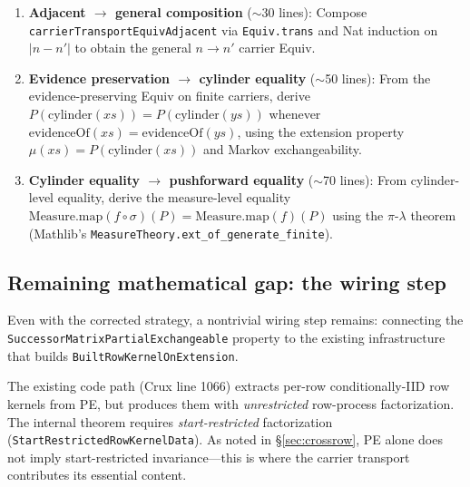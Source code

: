 \documentclass[11pt]{article}
\theoremstyle{definition}
\newcommand{\lean}[1]{\texttt{#1}}
\begin{document}
\begin{enumerate}[leftmargin=2em]
\item \textbf{Adjacent $\to$ general composition} ($\sim$30 lines):
  Compose \lean{carrierTransportEquivAdjacent} via \lean{Equiv.trans}
  and Nat induction on $|n - n'|$ to obtain the general $n \to n'$
  carrier Equiv.

\item \textbf{Evidence preservation $\to$ cylinder equality} ($\sim$50 lines):
  From the evidence-preserving Equiv on finite carriers, derive
  $P(\mathrm{cylinder}(xs)) = P(\mathrm{cylinder}(ys))$ whenever
  $\mathrm{evidenceOf}(xs) = \mathrm{evidenceOf}(ys)$, using the
  extension property $\mu(xs) = P(\mathrm{cylinder}(xs))$ and
  Markov exchangeability.

\item \textbf{Cylinder equality $\to$ pushforward equality} ($\sim$70 lines):
  From cylinder-level equality, derive the measure-level equality
  $\mathrm{Measure.map}(f \circ \sigma)(P) = \mathrm{Measure.map}(f)(P)$
  using the $\pi$-$\lambda$ theorem (Mathlib's
  \lean{MeasureTheory.ext\_of\_generate\_finite}).
\end{enumerate}

\subsection{Remaining mathematical gap: the wiring step}
\label{sec:wiring}

Even with the corrected strategy, a nontrivial wiring step remains:
connecting the \lean{SuccessorMatrixPartialExchangeable} property
to the existing infrastructure that builds
\lean{BuiltRowKernelOnExtension}.

The existing code path (Crux line 1066) extracts per-row
conditionally-IID row kernels from PE, but produces them with
\emph{unrestricted} row-process factorization.  The internal
theorem requires \emph{start-restricted} factorization
(\lean{StartRestrictedRowKernelData}).  As noted in
\S\ref{sec:crossrow}, PE alone does not imply start-restricted
invariance---this is where the carrier transport contributes its
essential content.
\end{document}
